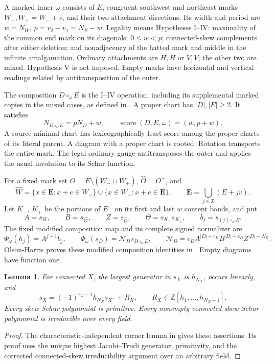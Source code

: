 \documentclass[11pt,a4paper]{amsart}
\numberwithin{equation}{section}
\theoremstyle{plain}
\newtheorem{lemma}[theorem]{Lemma}
\theoremstyle{definition}
\begin{document}
A marked inner \(\omega\) consists of \(E\), congruent southwest and northeast marks \(W_-,W_+=W_-+v\), and their two attachment directions.  Its width and period are \(w=N_W\), \(p=v_2-v_1=N_E-w\).  Legality means Hypotheses I--IV: maximality of the common end mark on its diagonals; \(0\le w<p\); connected-skew complements after either deletion; and nonadjacency of the hatted mark and middle in the infinite amalgamation.  Ordinary attachments are \(H,H\) or \(V,V\); the other two are mixed.  Hypothesis V is not imposed.  Empty marks have horizontal and vertical readings related by antitransposition of the outer.

The composition \(D\circ_\omega E\) is the I--IV operation, including its supplemental marked copies in the mixed cases, as defined in \cite{McNamara2009Classification,Shields2026Gluing}.  A proper chart has \(|D|,|E|\ge2\).  It satisfies
\[
 N_{D\circ_\omega E}=pN_D+w,\qquad
 \operatorname{score}(D,E,\omega)=(w,p+w).
\]
A source-minimal chart has lexicographically least score among the proper charts of its literal parent.  A diagram with a proper chart is rooted.  Rotation transports the entire mark.  The legal ordinary gauge antitransposes the outer and applies the usual involution to its Schur function.

For a fixed mark set \(O=E\setminus(W_-\cup W_+)\), \(\widehat O=O^-\), and
\[
 \widehat W=\{x\in\boldsymbol E:x+e\in W_-\}
 \cup\{x\in W_-:x+e\in\boldsymbol E\},\qquad
 \boldsymbol E=\bigcup_{j\in\mathbb Z}(E+jv).
\]
Let \(K_-\), \(K_+\) be the portions of \(E^-\) on its first and last \(w\) content bands, and put
\[
 A=s_W,\qquad B=s_{\widehat W},\qquad Z=s_{\widehat O},
 \qquad\Theta=s_{K_-}s_{K_+},\qquad b_j=s_{(j)\circ_\omega E}.
\]
The fixed modified composition map and its complete signed normalizer are
\begin{equation}\label{eq:modified-map}
 \Phi_\omega(h_j)=A^{j-1}b_j,\qquad
 \Phi_\omega(s_D)=\mathcal N_Ds_{D\circ_\omega E},\qquad
 \mathcal N_D=\epsilon_D A^{|D|-r_D}B^{|D|-c_D}Z^{|D|-N_D}.
\end{equation}
Olson-Harris proves these modified composition identities in \cite[\S5.6]{OlsonHarris2024HopfApplications}.  Empty diagrams have function one.

\begin{lemma}\label{lem:cofactor}
For connected \(X\), the largest generator in \(s_X\) is \(h_{N_X}\), occurs linearly, and
\[
 s_X=(-1)^{r_X-1}h_{N_X}s_{X^-}+R_X,
 \qquad R_X\in\mathbb Z[h_1,\ldots,h_{N_X-1}].
\]
Every skew Schur polynomial is primitive.  Every nonempty connected skew Schur polynomial is irreducible over every field.
\end{lemma}
\begin{proof}
The characteristic-independent corner lemma in \cite{Shields2026CornerDescent} gives these assertions.  Its proof uses the unique highest Jacobi--Trudi generator, primitivity, and the corrected connected-skew irreducibility argument over an arbitrary field.
\end{proof}
\end{document}
